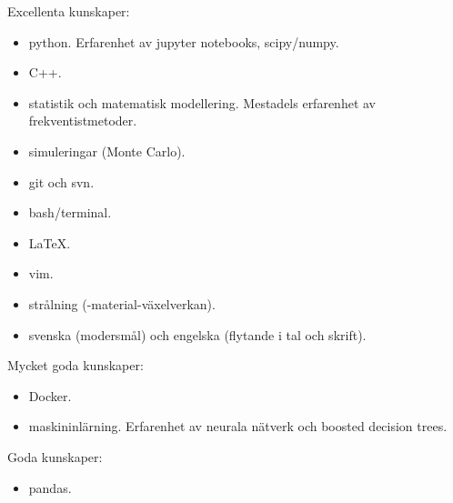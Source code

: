 



\begin{cvskills}



\cvskill
{Excellenta kunskaper:}
{\begin{itemize} \item python. Erfarenhet av jupyter notebooks, scipy/numpy.
						 \item C++.
						 \item statistik och matematisk modellering. Mestadels erfarenhet av frekventistmetoder.
						 \item simuleringar (Monte Carlo).
						 \item git och svn.
						 \item bash/terminal.
						 \item LaTeX.
						 \item vim.
						 \item strålning (-material-växelverkan).
						 \item svenska (modersmål) och engelska (flytande i tal och skrift).
						  \end{itemize}} %

\cvskill
{Mycket goda kunskaper:}
{\begin{itemize} \item Docker.
						\item maskininlärning. Erfarenhet av neurala nätverk och boosted decision trees.
						\end{itemize}} %

\cvskill
{Goda kunskaper:}
{\begin{itemize} \item pandas.
						\end{itemize}}





\end{cvskills}